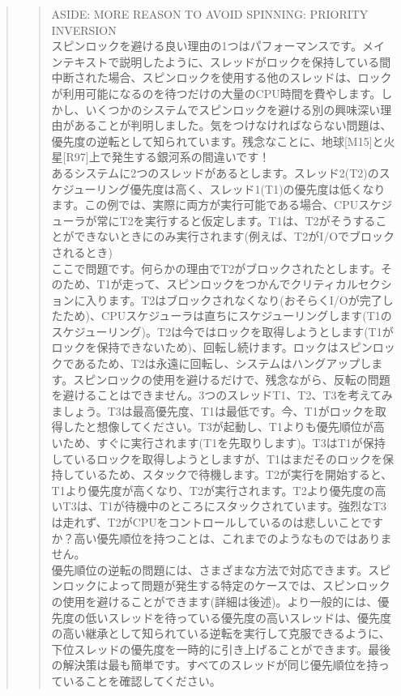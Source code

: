 \begin{quote}
\begin{quote}
ASIDE: MORE REASON TO AVOID SPINNING: PRIORITY INVERSION\\
スピンロックを避ける良い理由の1つはパフォーマンスです。メインテキストで説明したように、スレッドがロックを保持している間中断された場合、スピンロックを使用する他のスレッドは、ロックが利用可能になるのを待つだけの大量のCPU時間を費やします。しかし、いくつかのシステムでスピンロックを避ける別の興味深い理由があることが判明しました。気をつけなければならない問題は、優先度の逆転として知られています。残念なことに、地球{[}M15{]}と火星{[}R97{]}上で発生する銀河系の間違いです！\\
あるシステムに2つのスレッドがあるとします。スレッド2(T2)のスケジューリング優先度は高く、スレッド1(T1)の優先度は低くなります。この例では、実際に両方が実行可能である場合、CPUスケジューラが常にT2を実行すると仮定します。T1は、T2がそうすることができないときにのみ実行されます(例えば、T2がI/Oでブロックされるとき)\\
ここで問題です。何らかの理由でT2がブロックされたとします。そのため、T1が走って、スピンロックをつかんでクリティカルセクションに入ります。T2はブロックされなくなり(おそらくI/Oが完了したため)、CPUスケジューラは直ちにスケジューリングします(T1のスケジューリング)。T2は今ではロックを取得しようとします(T1がロックを保持できないため)、回転し続けます。ロックはスピンロックであるため、T2は永遠に回転し、システムはハングアップします。スピンロックの使用を避けるだけで、残念ながら、反転の問題を避けることはできません。3つのスレッドT1、T2、T3を考えてみましょう。T3は最高優先度、T1は最低です。今、T1がロックを取得したと想像してください。T3が起動し、T1よりも優先順位が高いため、すぐに実行されます(T1を先取りします)。T3はT1が保持しているロックを取得しようとしますが、T1はまだそのロックを保持しているため、スタックで待機します。T2が実行を開始すると、T1より優先度が高くなり、T2が実行されます。T2より優先度の高いT3は、T1が待機中のところにスタックされています。強烈なT3は走れず、T2がCPUをコントロールしているのは悲しいことですか？高い優先順位を持つことは、これまでのようなものではありません。\\
優先順位の逆転の問題には、さまざまな方法で対応できます。スピンロックによって問題が発生する特定のケースでは、スピンロックの使用を避けることができます(詳細は後述)。より一般的には、優先度の低いスレッドを待っている優先度の高いスレッドは、優先度の高い継承として知られている逆転を実行して克服できるように、下位スレッドの優先度を一時的に引き上げることができます。最後の解決策は最も簡単です。すべてのスレッドが同じ優先順位を持っていることを確認してください。
\end{quote}
\end{quote}

